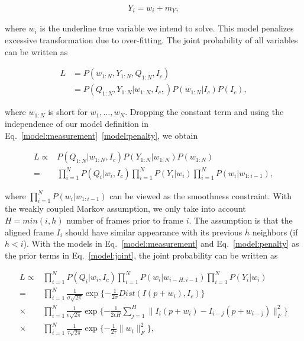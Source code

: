 \documentclass[10pt,journal]{IEEEtran}
\begin{document}
\begin{align}
\label{model:penalty}
Y_i=w_i+m_Y,
\end{align}

\noindent where $w_i$ is the underline true variable we intend to solve. This model penalizes excessive transformation due to over-fitting. The joint probability of all variables can be written as

\begin{equation}
\begin{aligned}
L&=P(w_{1:N},Y_{1:N},Q_{1:N},I_c) \\
 &=P(Q_{1:N},Y_{1:N}|w_{1:N},I_c,)P(w_{1:N}|I_c)P(I_c),
\end{aligned}
\end{equation}

\noindent where $w_{1:N}$ is short for $w_1,\ldots,w_N$. Dropping the constant term and using the independence of our model definition in Eq.~\eqref{model:measurement}~\eqref{model:penalty}, we obtain

\begin{equation}
\begin{aligned}
L\propto & P(Q_{1:N}|w_{1:N},I_c) P(Y_{1:N}|w_{1:N}) P(w_{1:N}) \\
				=& \prod_{i=1}^N{P(Q_i|w_i,I_c)} \prod_{i=1}^N{P(Y_i|w_i)} \prod_{i=1}^N {P(w_i|w_{1:i-1})},
\label{model:joint}
\end{aligned}
\end{equation}

\noindent where $\prod_{i=1}^N {P(w_i|w_{1:i-1})}$ can be viewed as the smoothness constraint. With the weakly coupled Markov assumption, we only take into account $H=min(i,h)$ number of frames prior to frame $i$. The assumption is that the aligned frame $I_i$ should have similar appearance with its previous $h$ neighbors (if $h<i$). With the models in Eq.~\eqref{model:measurement} and Eq.~\eqref{model:penalty} as the prior terms in Eq.~\eqref{model:joint}, the joint probability can be written as 

\begin{align}
L\propto & \prod_{i=1}^N{P(Q_i|w_i,I_c)} \prod_{i=1}^N {P(w_i|w_{i-H:i-1})} \prod_{i=1}^N{P(Y_i|w_i)} \\
\label{data_exp}
				=& \prod_{i=1}^N \frac{1}{\sigma \sqrt{2\pi}} \exp\{-\frac{1}{2\sigma}Dist(I(p+w_i),I_c)\}  \\
\label{smooth_exp}
				\times &\prod_{i=1}^N \frac{1}{\epsilon \sqrt{2\pi}} \exp\{-\frac{1}{2\epsilon H}\sum_{j=1}^{H}\parallel{I_i(p+w_i)-I_{i-j}(p+w_{i-j})}\parallel_F^2\} \\
\label{penalty_exp}
				\times &\prod_{i=1}^N \frac{1}{\tau \sqrt{2\pi}} \exp\{-\frac{1}{2\tau}\parallel{w_i}\parallel_F^2\},
\end{align}
\end{document}
